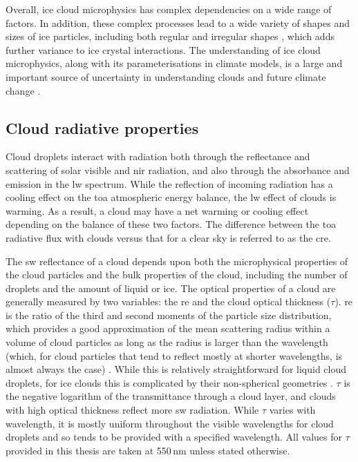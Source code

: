 Overall, ice cloud microphysics has complex dependencies on a wide range of factors.
In addition, these complex processes lead to a wide variety of shapes and sizes of ice particles, including both regular and irregular shapes \citep{waitz_situ_2022}, which adds further variance to ice crystal interactions.
The understanding of ice cloud microphysics, along with its parameterisations in climate models, is a large and important source of uncertainty in understanding clouds and future climate change \citep{sullivan_ice_2021, gasparini_opinion_2023}.


\subsection{Cloud radiative properties}

Cloud droplets interact with radiation both through the reflectance and scattering of solar visible and \acrfull{nir} radiation, and also through the absorbance and emission in the \acrshort{lw} spectrum.
While the reflection of incoming radiation has a cooling effect on the \acrfull{toa} atmospheric energy balance, the \acrshort{lw} effect of clouds is warming.
As a result, a cloud may have a net warming or cooling effect depending on the balance of these two factors.
The difference between the \acrshort{toa} radiative flux with clouds versus that for a clear sky is referred to as the \acrshort{cre}.

The \acrshort{sw} reflectance of a cloud depends upon both the microphysical properties of the cloud particles and the bulk properties of the cloud, including the number of droplets and the amount of liquid or ice.
The optical properties of a cloud are generally measured by two variables: the \acrfull{re} and the cloud optical thickness ($\tau$).
\acrshort{re} is the ratio of the third and second moments of the particle size distribution, which provides a good approximation of the mean scattering radius within a volume of cloud particles as long as the radius is larger than the wavelength (which, for cloud particles that tend to reflect mostly at shorter wavelengths, is almost always the case) \citep{hansen_light_1974}. 
While this is relatively straightforward for liquid cloud droplets, for ice clouds this is complicated by their non-spherical geometries \citep{wyser_effective_1998}.
$\tau$ is the negative logarithm of the transmittance through a cloud layer, and clouds with high optical thickness reflect more \acrshort{sw} radiation.
While $\tau$ varies with wavelength, it is mostly uniform throughout the visible wavelengths for cloud droplets and so tends to be provided with a specified wavelength.
All values for $\tau$ provided in this thesis are taken at 550\,\unit{nm} unless stated otherwise.

